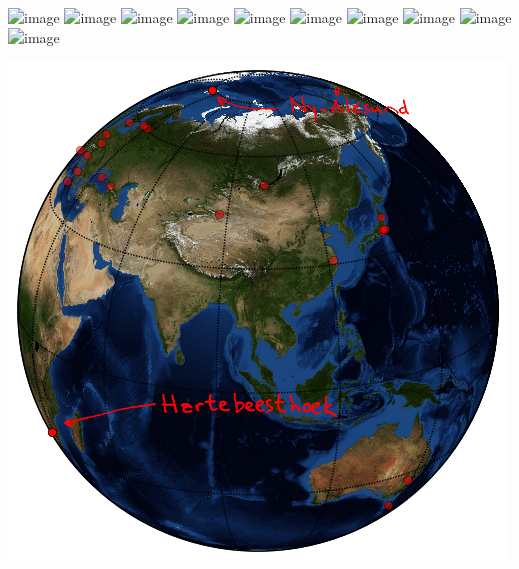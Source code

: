 \documentclass[12pt,table,t]{beamer}
\begin{document}
\begin{frame}[c]{}
  \begin{center}
    \includegraphics<1>[width=\textwidth]{figure/vlbi_koords}
    \includegraphics<2>[width=\textwidth]{figure/ref_punkter_01}
    \includegraphics<3>[width=\textwidth]{figure/ref_punkter_02}
    \includegraphics<4>[width=\textwidth]{figure/ref_punkter_03}
    \includegraphics<5>[width=\textwidth]{figure/vlbi_kart}
    \includegraphics<6>[width=\textwidth]{figure/antagelser_01}
    \includegraphics<7>[width=\textwidth]{figure/antagelser_02}
    \includegraphics<8>[width=\textwidth]{figure/antagelser_03}
    \includegraphics<9>[width=\textwidth]{figure/estimering_01}
    \includegraphics<10>[width=\textwidth]{figure/estimering_02}
  \end{center}
\end{frame}

\begin{frame}[c]{}
  \begin{center}
    \includegraphics[height=0.8\textheight]{figure/vlbi_baseline_100_pts_labels}
  \end{center}
\end{frame}
\end{document}
